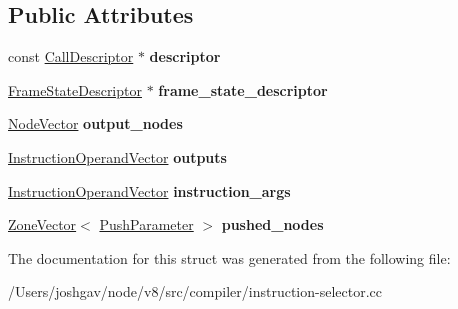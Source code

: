 \subsection*{Public Attributes}
\begin{DoxyCompactItemize}
\item 
const \hyperlink{classv8_1_1internal_1_1compiler_1_1_call_descriptor}{Call\+Descriptor} $\ast$ {\bfseries descriptor}\hypertarget{structv8_1_1internal_1_1compiler_1_1_call_buffer_ac01bec5c0ded21dd536ac3eef10896a4}{}\label{structv8_1_1internal_1_1compiler_1_1_call_buffer_ac01bec5c0ded21dd536ac3eef10896a4}

\item 
\hyperlink{classv8_1_1internal_1_1compiler_1_1_frame_state_descriptor}{Frame\+State\+Descriptor} $\ast$ {\bfseries frame\+\_\+state\+\_\+descriptor}\hypertarget{structv8_1_1internal_1_1compiler_1_1_call_buffer_ab49f4b1602a95d0a2bd1bd680dc22bf8}{}\label{structv8_1_1internal_1_1compiler_1_1_call_buffer_ab49f4b1602a95d0a2bd1bd680dc22bf8}

\item 
\hyperlink{classv8_1_1internal_1_1_zone_vector}{Node\+Vector} {\bfseries output\+\_\+nodes}\hypertarget{structv8_1_1internal_1_1compiler_1_1_call_buffer_ac48944371a6d03eddea5be2524316d35}{}\label{structv8_1_1internal_1_1compiler_1_1_call_buffer_ac48944371a6d03eddea5be2524316d35}

\item 
\hyperlink{classv8_1_1internal_1_1_zone_vector}{Instruction\+Operand\+Vector} {\bfseries outputs}\hypertarget{structv8_1_1internal_1_1compiler_1_1_call_buffer_aa7cbccfca0141ad2eaa01d78a1656c76}{}\label{structv8_1_1internal_1_1compiler_1_1_call_buffer_aa7cbccfca0141ad2eaa01d78a1656c76}

\item 
\hyperlink{classv8_1_1internal_1_1_zone_vector}{Instruction\+Operand\+Vector} {\bfseries instruction\+\_\+args}\hypertarget{structv8_1_1internal_1_1compiler_1_1_call_buffer_a9d22523b1d238ca4370ca16d65523a35}{}\label{structv8_1_1internal_1_1compiler_1_1_call_buffer_a9d22523b1d238ca4370ca16d65523a35}

\item 
\hyperlink{classv8_1_1internal_1_1_zone_vector}{Zone\+Vector}$<$ \hyperlink{classv8_1_1internal_1_1compiler_1_1_push_parameter}{Push\+Parameter} $>$ {\bfseries pushed\+\_\+nodes}\hypertarget{structv8_1_1internal_1_1compiler_1_1_call_buffer_a488391c7beac4435a12deb79cddcd9d9}{}\label{structv8_1_1internal_1_1compiler_1_1_call_buffer_a488391c7beac4435a12deb79cddcd9d9}

\end{DoxyCompactItemize}


The documentation for this struct was generated from the following file\+:\begin{DoxyCompactItemize}
\item 
/\+Users/joshgav/node/v8/src/compiler/instruction-\/selector.\+cc\end{DoxyCompactItemize}
